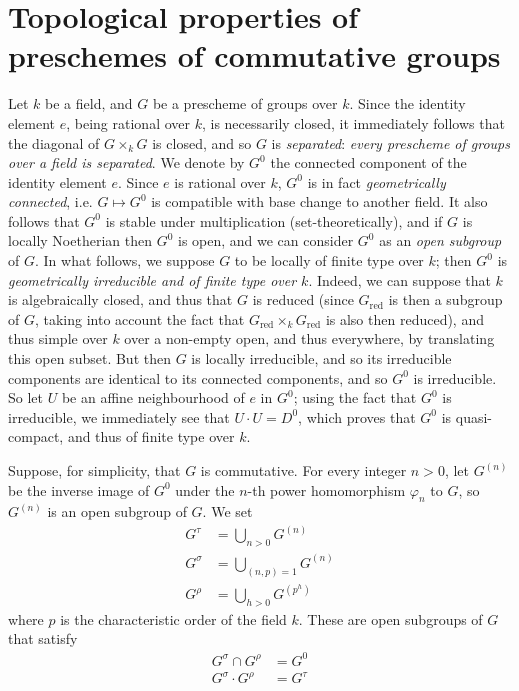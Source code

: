 \section{Topological properties of preschemes of commutative groups}\label{fga3.vi-1}

Let $k$ be a field, and $G$ be a prescheme of groups over $k$.
Since the identity element $e$, being rational over $k$, is necessarily closed, it immediately follows that the diagonal of $G\times_k G$ is closed, and so $G$ is \emph{separated}: \emph{every prescheme of groups over a field is separated}.
We denote by $G^0$ the connected component of the identity element $e$.
Since $e$ is rational over $k$, $G^0$ is in fact \emph{geometrically connected}, i.e. $G\mapsto G^0$ is compatible with base change to another field.
It also follows that $G^0$ is stable under multiplication (set-theoretically), and if $G$ is locally Noetherian then $G^0$ is open, and we can consider $G^0$ as an \emph{open subgroup} of $G$.
In what follows, we suppose $G$ to be locally of finite type over $k$;
then $G^0$ is \emph{geometrically irreducible and of finite type over $k$}.
Indeed, we can suppose that $k$ is algebraically closed, and thus that $G$ is reduced (since $G_\mathrm{red}$ is then a subgroup of $G$, taking into account the fact that $G_\mathrm{red}\times_k G_\mathrm{red}$ is also then reduced), and thus simple over $k$ over a non-empty open, and thus everywhere, by translating this open subset.
But then $G$ is locally irreducible, and so its irreducible components are identical to its connected components, and so $G^0$ is irreducible.
So let $U$ be an affine neighbourhood of $e$ in $G^0$;
using the fact that $G^0$ is irreducible, we immediately see that $U\cdot U=D^0$, which proves that $G^0$ is quasi-compact, and thus of finite type over $k$.

Suppose, for simplicity, that $G$ is commutative.
For every integer $n>0$, let $G^{(n)}$ be the inverse image of $G^0$ under the $n$-th power homomorphism $\varphi_n$ to $G$, so $G^{(n)}$ is an open subgroup of $G$.
We set
\[
    \begin{aligned}
        G^\tau & = \bigcup_{n>0} G^{(n)}\\
        G^\sigma & = \bigcup_{(n,p)=1} G^{(n)}\\
        G^\rho & = \bigcup_{h>0} G^{(p^h)}
    \end{aligned}
\]
where $p$ is the characteristic order of the field $k$.
These are open subgroups of $G$ that satisfy
\[
    \begin{aligned}
        G^\sigma \cap G^\rho  & = G^0    \\
        G^\sigma \cdot G^\rho & = G^\tau
    \end{aligned}
\]

